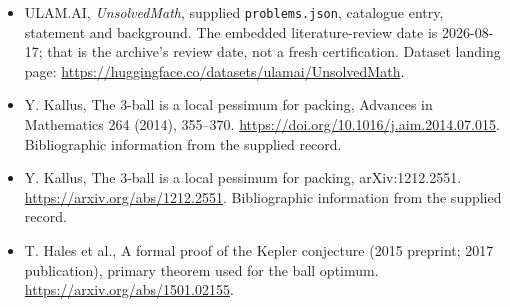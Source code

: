 \documentclass[11pt,a4paper]{article}
\begin{document}
{\small

\begin{itemize}

\item[\hypertarget{source:statement:1}{S1}] ULAM.AI, \emph{UnsolvedMath}, supplied \texttt{problems.json}, catalogue entry, statement and background. The embedded literature-review date is 2026-08-17; that is the archive’s review date, not a fresh certification. Dataset landing page: \url{https://huggingface.co/datasets/ulamai/UnsolvedMath}.

\item[\hypertarget{source:statement:2}{S2}] Y. Kallus, The 3-ball is a local pessimum for packing, Advances in Mathematics 264 (2014), 355–370. \url{https://doi.org/10.1016/j.aim.2014.07.015}. Bibliographic information from the supplied record.

\item[\hypertarget{source:statement:3}{S3}] Y. Kallus, The 3-ball is a local pessimum for packing, arXiv:1212.2551. \url{https://arxiv.org/abs/1212.2551}. Bibliographic information from the supplied record.

\item[R1] T. Hales et al., A formal proof of the Kepler conjecture (2015 preprint; 2017 publication), primary theorem used for the ball optimum.
\url{https://arxiv.org/abs/1501.02155}.
\end{itemize}

}

\label{end:statement}
\end{document}
